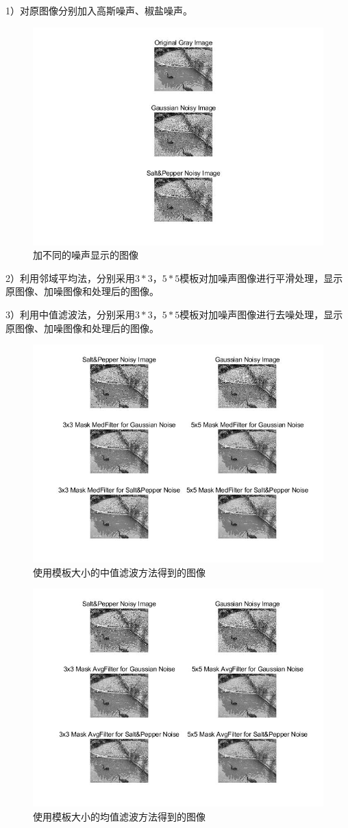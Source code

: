 \documentclass[UTF8]{article} %
\begin{document}
	1）对原图像分别加入高斯噪声、椒盐噪声。
	\begin{figure}[H]
		\centering
		\includegraphics[width=0.7\linewidth]{3-1}
		\caption{加不同的噪声显示的图像}
		\label{fig:3-1}
	\end{figure}
	
	
	2）利用邻域平均法，分别采用$3*3$，$5*5$模板对加噪声图像进行平滑处理，显示原图像、加噪图像和处理后的图像。
	
	3）利用中值滤波法，分别采用$3*3$，$5*5$模板对加噪声图像进行去噪处理，显示原图像、加噪图像和处理后的图像。
	\begin{figure}[H]
		\centering
		\includegraphics[width=0.7\linewidth]{3-2}
		\caption{使用模板大小的中值滤波方法得到的图像}
		\label{fig:3-2}
	\end{figure}

	\begin{figure}[H]
		\centering
		\includegraphics[width=0.7\linewidth]{3-3}
		\caption{使用模板大小的均值滤波方法得到的图像}
		\label{fig:3-3}
	\end{figure}
	
\end{document}
